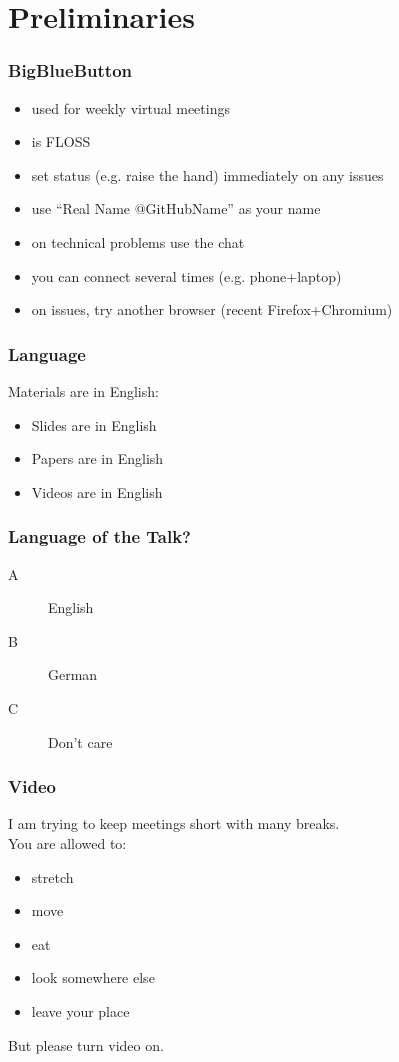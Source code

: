 

\title{\mylecture}
\date{Hello}



\section{Preliminaries}

\begin{frame}
	\frametitle{BigBlueButton}
	\begin{itemize}
		\item used for weekly virtual meetings
		\item is FLOSS
		\item set status (e.g. raise the hand) immediately on any issues
		\item use ``Real Name @GitHubName'' as your name
		\item on technical problems use the chat
		\item you can connect several times (e.g. phone+laptop)
		\item on issues, try another browser (recent Firefox+Chromium)
	\end{itemize}
\end{frame}

\begin{frame}
	\frametitle{Language}
	Materials are in English:
	\begin{itemize}
		\item Slides are in English
		\item Papers are in English
		\item Videos are in English
	\end{itemize}
\end{frame}

\begin{assignment}
	\frametitle{Language of the Talk?}
	\begin{task}
	\begin{description}
	\item[A] English
	\item[B] German
	\item[C] Don't care
	\end{description}
	\end{task}
\end{assignment}

\begin{assignment}
	\frametitle{Video}
	I am trying to keep meetings short with many breaks. \\
	You are allowed to:
	\begin{itemize}
		\item stretch
		\item move
		\item eat
		\item look somewhere else
		\item leave your place
	\end{itemize}
	\begin{task}
	But please turn video on.
	\end{task}
\end{assignment}

